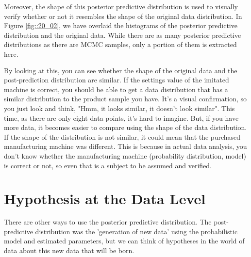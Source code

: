 \documentclass{ltjsbook}
\begin{document}
Moreover, the shape of this posterior predictive distribution is used to visually verify whether or not it resembles the shape of the original data distribution. In Figure \ref{fig::20_02}, we have overlaid the histograms of the posterior predictive distribution and the original data. While there are as many posterior predictive distributions as there are MCMC samples, only a portion of them is extracted here.

By looking at this, you can see whether the shape of the original data and the post-prediction distribution are similar. If the settings value of the imitated machine is correct, you should be able to get a data distribution that has a similar distribution to the product sample you have.
It's a visual confirmation, so you just look and think, "Hmm, it looks similar, it doesn't look similar". This time, as there are only eight data points, it's hard to imagine. But, if you have more data, it becomes easier to compare using the shape of the data distribution. If the shape of the distribution is not similar, it could mean that the purchased manufacturing machine was different. This is because in actual data analysis, you don't know whether the manufacturing machine (probability distribution, model) is correct or not, so even that is a subject to be assumed and verified.

\section{Hypothesis at the Data Level}
There are other ways to use the posterior predictive distribution.
The post-predictive distribution was the 'generation of new data' using the probabilistic model and estimated parameters, but we can think of hypotheses in the world of data about this new data that will be born.
\end{document}
